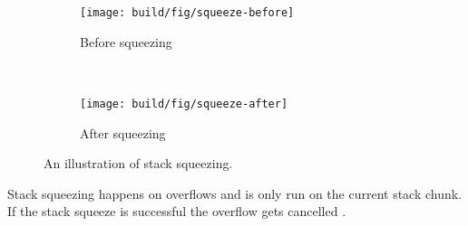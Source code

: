 \begin{figure}
\begin{mdframed}
  \begin{subfigure}[t]{0.5\textwidth}
    \texttt{[image: build/fig/squeeze-before]}
    \caption{Before squeezing}
  \end{subfigure}
        ~ %
  \begin{subfigure}[t]{0.5\textwidth}
    \texttt{[image: build/fig/squeeze-after]}
    \caption{After squeezing}
  \end{subfigure}
  \caption{An illustration of stack squeezing.
  }\label{fig:stack_squeezing}
\end{mdframed}
\end{figure}

Stack squeezing happens on overflows and is only run on the current
stack chunk. If the stack squeeze is successful the overflow gets cancelled
\cite{github_return_if_squeezed}.
